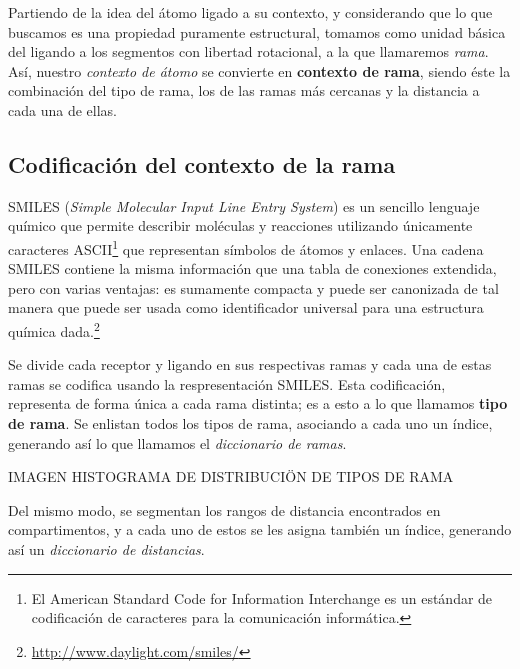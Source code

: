 Partiendo de la idea del átomo ligado a su contexto, y considerando
que lo que buscamos es una propiedad puramente estructural, tomamos
como unidad básica del ligando a los segmentos con libertad
rotacional, a la que llamaremos \textit{rama}. Así, nuestro
\textit{contexto de átomo} se convierte en \textbf{contexto de rama},
siendo éste la combinación del tipo de rama, los de las ramas más
cercanas y la distancia a cada una de ellas.

\subsection{Codificación del contexto de la rama}
SMILES (\textit{Simple Molecular Input Line Entry System}) es un
sencillo lenguaje químico que permite describir moléculas y reacciones
utilizando únicamente caracteres ASCII\footnote{El American Standard
  Code for Information Interchange es un estándar de codificación de
  caracteres para la comunicación informática.} que representan
símbolos de átomos y enlaces. Una cadena SMILES contiene la misma
información que una tabla de conexiones extendida, pero con varias
ventajas: es sumamente compacta y puede ser canonizada de tal manera
que puede ser usada como identificador universal para una estructura
química dada.\footnote{\url{http://www.daylight.com/smiles/}}

Se divide cada receptor y ligando en sus respectivas ramas y cada una
de estas ramas se codifica usando la respresentación SMILES. Esta
codificación, representa de forma única a cada rama distinta; es a
esto a lo que llamamos \textbf{tipo de rama}. Se enlistan todos los
tipos de rama, asociando a cada uno un índice, generando así lo que
llamamos el \textit{diccionario de ramas}.

IMAGEN HISTOGRAMA DE DISTRIBUCIÖN DE TIPOS DE RAMA

Del mismo modo, se segmentan los rangos de distancia encontrados en
compartimentos, y a cada uno de estos se les asigna también un índice,
generando así un \textit{diccionario de distancias}.

